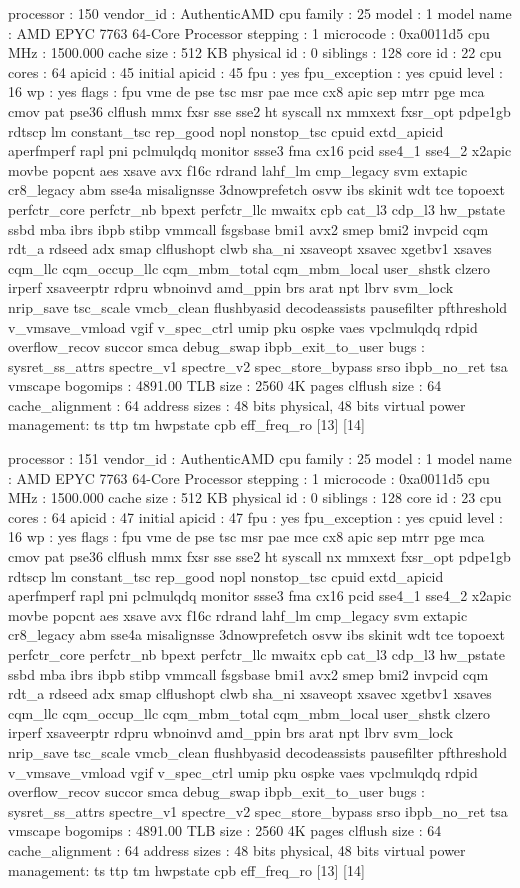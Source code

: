 processor	: 150
vendor_id	: AuthenticAMD
cpu family	: 25
model		: 1
model name	: AMD EPYC 7763 64-Core Processor
stepping	: 1
microcode	: 0xa0011d5
cpu MHz		: 1500.000
cache size	: 512 KB
physical id	: 0
siblings	: 128
core id		: 22
cpu cores	: 64
apicid		: 45
initial apicid	: 45
fpu		: yes
fpu_exception	: yes
cpuid level	: 16
wp		: yes
flags		: fpu vme de pse tsc msr pae mce cx8 apic sep mtrr pge mca cmov pat pse36 clflush mmx fxsr sse sse2 ht syscall nx mmxext fxsr_opt pdpe1gb rdtscp lm constant_tsc rep_good nopl nonstop_tsc cpuid extd_apicid aperfmperf rapl pni pclmulqdq monitor ssse3 fma cx16 pcid sse4_1 sse4_2 x2apic movbe popcnt aes xsave avx f16c rdrand lahf_lm cmp_legacy svm extapic cr8_legacy abm sse4a misalignsse 3dnowprefetch osvw ibs skinit wdt tce topoext perfctr_core perfctr_nb bpext perfctr_llc mwaitx cpb cat_l3 cdp_l3 hw_pstate ssbd mba ibrs ibpb stibp vmmcall fsgsbase bmi1 avx2 smep bmi2 invpcid cqm rdt_a rdseed adx smap clflushopt clwb sha_ni xsaveopt xsavec xgetbv1 xsaves cqm_llc cqm_occup_llc cqm_mbm_total cqm_mbm_local user_shstk clzero irperf xsaveerptr rdpru wbnoinvd amd_ppin brs arat npt lbrv svm_lock nrip_save tsc_scale vmcb_clean flushbyasid decodeassists pausefilter pfthreshold v_vmsave_vmload vgif v_spec_ctrl umip pku ospke vaes vpclmulqdq rdpid overflow_recov succor smca debug_swap ibpb_exit_to_user
bugs		: sysret_ss_attrs spectre_v1 spectre_v2 spec_store_bypass srso ibpb_no_ret tsa vmscape
bogomips	: 4891.00
TLB size	: 2560 4K pages
clflush size	: 64
cache_alignment	: 64
address sizes	: 48 bits physical, 48 bits virtual
power management: ts ttp tm hwpstate cpb eff_freq_ro [13] [14]

processor	: 151
vendor_id	: AuthenticAMD
cpu family	: 25
model		: 1
model name	: AMD EPYC 7763 64-Core Processor
stepping	: 1
microcode	: 0xa0011d5
cpu MHz		: 1500.000
cache size	: 512 KB
physical id	: 0
siblings	: 128
core id		: 23
cpu cores	: 64
apicid		: 47
initial apicid	: 47
fpu		: yes
fpu_exception	: yes
cpuid level	: 16
wp		: yes
flags		: fpu vme de pse tsc msr pae mce cx8 apic sep mtrr pge mca cmov pat pse36 clflush mmx fxsr sse sse2 ht syscall nx mmxext fxsr_opt pdpe1gb rdtscp lm constant_tsc rep_good nopl nonstop_tsc cpuid extd_apicid aperfmperf rapl pni pclmulqdq monitor ssse3 fma cx16 pcid sse4_1 sse4_2 x2apic movbe popcnt aes xsave avx f16c rdrand lahf_lm cmp_legacy svm extapic cr8_legacy abm sse4a misalignsse 3dnowprefetch osvw ibs skinit wdt tce topoext perfctr_core perfctr_nb bpext perfctr_llc mwaitx cpb cat_l3 cdp_l3 hw_pstate ssbd mba ibrs ibpb stibp vmmcall fsgsbase bmi1 avx2 smep bmi2 invpcid cqm rdt_a rdseed adx smap clflushopt clwb sha_ni xsaveopt xsavec xgetbv1 xsaves cqm_llc cqm_occup_llc cqm_mbm_total cqm_mbm_local user_shstk clzero irperf xsaveerptr rdpru wbnoinvd amd_ppin brs arat npt lbrv svm_lock nrip_save tsc_scale vmcb_clean flushbyasid decodeassists pausefilter pfthreshold v_vmsave_vmload vgif v_spec_ctrl umip pku ospke vaes vpclmulqdq rdpid overflow_recov succor smca debug_swap ibpb_exit_to_user
bugs		: sysret_ss_attrs spectre_v1 spectre_v2 spec_store_bypass srso ibpb_no_ret tsa vmscape
bogomips	: 4891.00
TLB size	: 2560 4K pages
clflush size	: 64
cache_alignment	: 64
address sizes	: 48 bits physical, 48 bits virtual
power management: ts ttp tm hwpstate cpb eff_freq_ro [13] [14]

